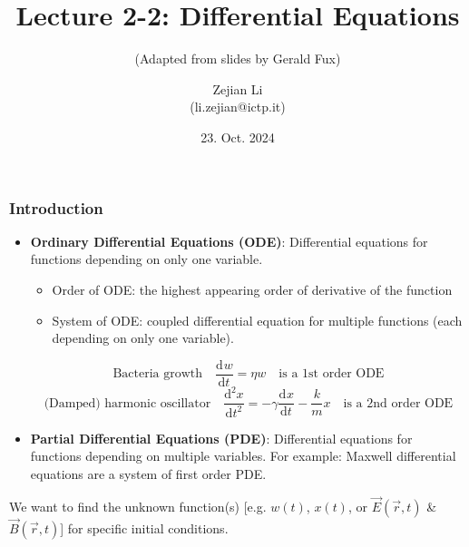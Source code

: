 \documentclass[11pt,aspectratio=169,handout]{beamer}
\newcommand{\dif}[3][]{\frac{\mathrm{d}^{#1}#3}{\mathrm{d}{#2}^{#1}}}
\begin{document}
\author{Zejian Li \\(li.zejian@ictp.it)}
\title{Lecture 2-2: Differential Equations}
\subtitle{(Adapted from slides by Gerald Fux)}
\date{23. Oct. 2024}


\begin{frame}[plain]
	\maketitle
\end{frame}



\begin{frame}
\frametitle{Introduction}
\begin{itemize}
	\item \textbf{Ordinary Differential Equations (ODE)}: 
	Differential equations for functions depending on only one variable.
	\pause
	\begin{itemize}
		\item Order of ODE: the highest appearing order of derivative of the function
		\pause
		\item System of ODE: coupled differential equation for multiple functions (each depending on only one variable).
	\end{itemize}
	\pause
	$$ \text{Bacteria growth} \quad \dif{t}{w} = \eta w \quad \text{is a 1st order ODE}$$
	\pause
	$$ \text{(Damped) harmonic oscillator} \quad \dif[2]{t}{x} = -\gamma \dif{t}x -\frac{k}{m} x \quad \text{is a 2nd order ODE}$$
	\pause
	\item \textbf{Partial Differential Equations (PDE)}:
	Differential equations for functions depending on multiple variables.
	For example: Maxwell differential equations are a system of first order PDE.
\end{itemize}
\pause
We want to find the unknown function(s) [e.g. $w(t)$, $x(t)$, or $\vec{E}(\vec{r},t)$ \& $\vec{B}(\vec{r},t)$] for specific initial conditions.
\end{frame}
\end{document}

